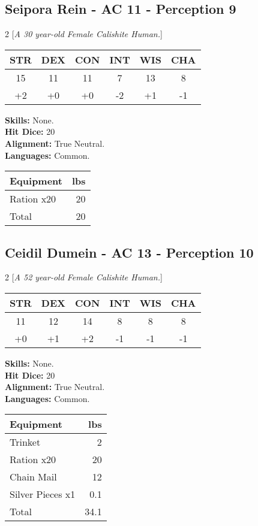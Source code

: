 \subsection*{Seipora Rein - AC 11 - Perception 9}
\begin{multicols}{2}
[\textit{A 30 year-old Female Calishite Human.}]
\begin{tabular}{cccccc}
 {STR}&
 {DEX}&
 {CON}&
 {INT}&
 {WIS}&
 {CHA}\\
\hline
15 & 11 & 11 & 7 & 13 & 8\\
+2 & +0 & +0 & -2 & +1 & -1
\end{tabular}
\textbf{Skills:} 
None.\\
\textbf{Hit Dice:} 20\\
\textbf{Alignment:} True Neutral.\\
\textbf{Languages:} 
Common.\\

\begin{tabular}{p{} r}
\textbf{Equipment} & lbs\\
\hline

Ration x20 & 20\\

\hline
Total & 20
\end{tabular}


\end{multicols}


\subsection*{Ceidil Dumein - AC 13 - Perception 10}
\begin{multicols}{2}
[\textit{A 52 year-old Female Calishite Human.}]
\begin{tabular}{cccccc}
 {STR}&
 {DEX}&
 {CON}&
 {INT}&
 {WIS}&
 {CHA}\\
\hline
11 & 12 & 14 & 8 & 8 & 8\\
+0 & +1 & +2 & -1 & -1 & -1
\end{tabular}
\textbf{Skills:} 
None.\\
\textbf{Hit Dice:} 20\\
\textbf{Alignment:} True Neutral.\\
\textbf{Languages:} 
Common.\\

\begin{tabular}{p{} r}
\textbf{Equipment} & lbs\\
\hline

Trinket & 2\\

Ration x20 & 20\\

Chain Mail & 12\\

Silver Pieces x1 & 0.1\\

\hline
Total & 34.1
\end{tabular}


\end{multicols}


